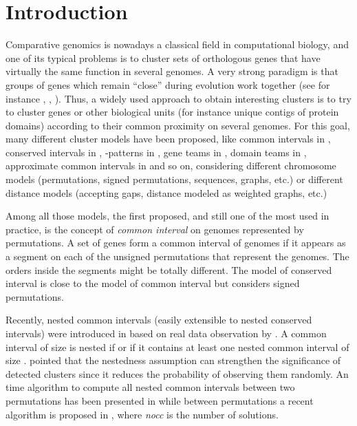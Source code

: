 \documentclass{article}
\begin{document}
\section{Introduction}  
\label{sec:intro}  





Comparative genomics is nowadays a classical field in computational
biology, and one of its typical problems is to cluster sets of
orthologous genes that have virtually the same function in several
genomes. A very strong paradigm is that groups of genes which remain
``close'' during evolution work together (see for instance \citet{galperin2000s}, \citet{lathe2000gene}, \citet{tamames2001evolution}).
Thus, a widely  used approach
to obtain interesting clusters is to try to cluster genes or other
biological units (for instance unique contigs of protein domains)
according to their common proximity on several genomes.  For this
goal, many different cluster models have been proposed, like common
intervals in \citet{UnoYagura}, conserved intervals in \citet{BergeronBCC04},
-patterns in \citet{Parida06}, gene teams in \citet{BealBCR04}, domain
teams in \citet{Pasek2005}, approximate common intervals in \citet{AmirGS07}
and so on, considering different chromosome models (permutations,
signed permutations, sequences, graphs, etc.) or
different distance models (accepting gaps, distance modeled as
weighted graphs, etc.)

Among all those models, the first proposed, and still
one of the most used in practice, is the concept of \emph{common
  interval} on genomes represented by permutations. A set of genes
form a common interval of  genomes if it appears as a segment on
each of the  unsigned permutations that represent the genomes. The orders
inside the segments might be totally different.  The model of
conserved interval is close to the model of common interval but
considers signed permutations. 


Recently, nested common intervals (easily extensible to nested
conserved intervals) were introduced in \citet{HD05} based on real data
observation by \citet{The10}. A common interval  of size  is nested 
if  or if it contains at least one  nested common interval of size .
\citet{HD05} pointed that
the nestedness assumption can strengthen the significance of detected
clusters since it reduces the probability of observing them randomly.
An  time algorithm to compute all nested common intervals
between two permutations has been presented in \citet{BlinFS10} while
between  permutations a recent  algorithm is
proposed in \citet{IR}, where \emph{nocc} is the number of solutions.
\end{document}
